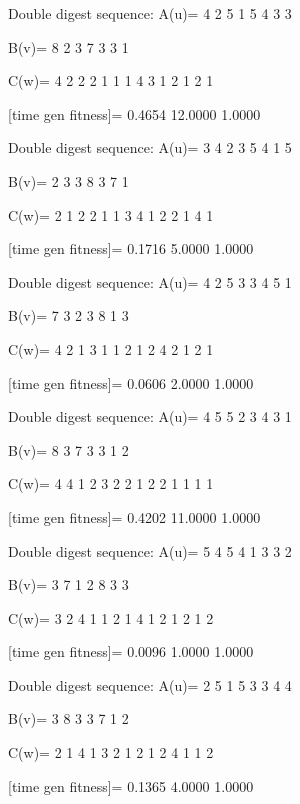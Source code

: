 Double digest sequence:
A(u)=
     4     2     5     1     5     4     3     3

B(v)=
     8     2     3     7     3     3     1

C(w)=
     4     2     2     2     1     1     1     4     3     1     2     1     2     1

[time gen fitness]=
    0.4654   12.0000    1.0000

Double digest sequence:
A(u)=
     3     4     2     3     5     4     1     5

B(v)=
     2     3     3     8     3     7     1

C(w)=
     2     1     2     2     1     1     3     4     1     2     2     1     4     1

[time gen fitness]=
    0.1716    5.0000    1.0000

Double digest sequence:
A(u)=
     4     2     5     3     3     4     5     1

B(v)=
     7     3     2     3     8     1     3

C(w)=
     4     2     1     3     1     1     2     1     2     4     2     1     2     1

[time gen fitness]=
    0.0606    2.0000    1.0000

Double digest sequence:
A(u)=
     4     5     5     2     3     4     3     1

B(v)=
     8     3     7     3     3     1     2

C(w)=
     4     4     1     2     3     2     2     1     2     2     1     1     1     1

[time gen fitness]=
    0.4202   11.0000    1.0000

Double digest sequence:
A(u)=
     5     4     5     4     1     3     3     2

B(v)=
     3     7     1     2     8     3     3

C(w)=
     3     2     4     1     1     2     1     4     1     2     1     2     1     2

[time gen fitness]=
    0.0096    1.0000    1.0000

Double digest sequence:
A(u)=
     2     5     1     5     3     3     4     4

B(v)=
     3     8     3     3     7     1     2

C(w)=
     2     1     4     1     3     2     1     2     1     2     4     1     1     2

[time gen fitness]=
    0.1365    4.0000    1.0000

